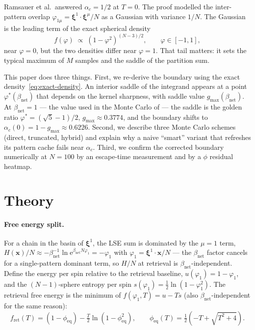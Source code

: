 \documentclass[11pt]{article}
\newcommand{\bxi}{\boldsymbol{\xi}}
\newcommand{\bx}{\bm{x}}
\newcommand{\e}{{\mathrm{e}}}
\newcommand{\Bnet}{\beta_{\mathrm{net}}}
\newcommand{\phieq}{\phi_{\mathrm{eq}}}
\newcommand{\fret}{f_{\mathrm{ret}}}
\newcommand{\gmax}{g_{\max}}
\begin{document}
Ramsauer et al.\ answered $\alpha_c = 1/2$ at $T = 0$.  The proof
modelled the inter-pattern overlap
$\varphi_{1\mu} = \bxi^1 \cdot \bxi^\mu / N$ as a Gaussian with variance
$1/N$.  The Gaussian is the leading term of the exact spherical density
\begin{equation}
f(\varphi) \;\propto\; (1 - \varphi^2)^{(N-3)/2},
\qquad \varphi \in [-1, 1],
\label{eq:exact-density}
\end{equation}
near $\varphi = 0$, but the two densities differ near $\varphi = 1$.
That tail matters: it sets the typical maximum of $M$ samples and the
saddle of the partition sum.

This paper does three things.  First, we re-derive the boundary using
the exact density~\eqref{eq:exact-density}.  An interior saddle of the
integrand appears at a point $\varphi^{*}(\Bnet)$ that depends on the
kernel sharpness, with saddle value $\gmax(\Bnet)$.  At $\Bnet = 1$ —
the value used in the Monte Carlo of  — the
saddle is the golden ratio $\varphi^{*} = (\sqrt 5 - 1)/2$,
$\gmax \approx 0.3774$, and the boundary shifts to
$\alpha_c(0) = 1 - \gmax \approx 0.6226$.  Second, we describe three
Monte Carlo schemes (direct, truncated, hybrid) and explain why a naive
``smart'' variant that refreshes its pattern cache fails near
$\alpha_c$.  Third, we confirm the corrected boundary numerically at
$N = 100$ by an escape-time measurement and by a $\phi$ residual
heatmap.

\section{Theory}
\label{sec:theory}

\paragraph{Free energy split.}
For a chain in the basin of $\bxi^1$, the LSE sum is dominated by the
$\mu = 1$ term, $H(\bx)/N \approx -\Bnet^{-1} \ln \e^{\Bnet N \varphi_1}
= -\varphi_1$ with $\varphi_1 = \bxi^1 \cdot \bx / N$ — the $\Bnet$
factor cancels for a single-pattern dominant term, so $H/N$ at retrieval
is $\Bnet$-independent.  Define the energy per spin relative to the
retrieval baseline, $u(\varphi_1) = 1 - \varphi_1$, and the
$(N\!-\!1)$-sphere entropy per spin $s(\varphi_1) = \tfrac12 \ln(1 -
\varphi_1^2)$.  The retrieval free energy is the minimum of
$f(\varphi_1, T) = u - T s$ (also $\Bnet$-independent for the same
reason):
\begin{equation}
\fret(T) = (1 - \phieq) - \tfrac{T}{2} \ln(1 - \phieq^2),
\qquad
\phieq(T) = \tfrac12 (-T + \sqrt{T^2 + 4}).
\label{eq:fret}
\end{equation}
\end{document}
